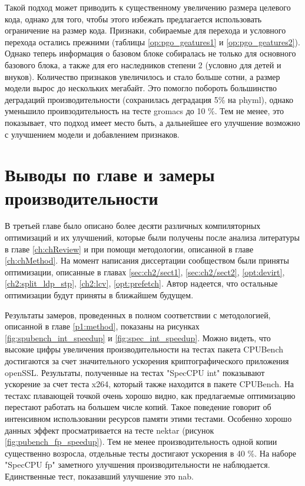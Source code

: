 Такой подход может приводить к существенному увеличению размера целевого кода, однако для того, чтобы этого избежать предлагается использовать ограничение на размер кода. Признаки, собираемые для перехода и условного перехода остались прежними (таблицы \ref{op:pgo_geatures1} и \ref{op:pgo_geatures2}). Однако теперь информация о базовом блоке собиралась не только для основного базового блока, а также для его наследников степени 2 (условно для детей и внуков). Количество признаков увеличилось и стало больше сотни, а размер модели вырос до нескольких мегабайт. Это помогло побороть большинство деградаций производительности (сохранилась деградация 5\% на phyml), однако уменьшило проивзодительность на тесте gromacs до 10 \%. Тем не менее, это показывает, что подход имеет место быть, а дальнейшее его улучшение возможно с улучшением модели и добавлением признаков.

\section{Выводы по главе и замеры производительности}  \label{results}
В третьей главе  было описано более десяти различных компиляторных оптимизаций и их улучшений, которые были получены после анализа литературы в главе \ref{ch:chReview} и при помощи методологии, описанной в главе \ref{ch:chMethod}. На момент написания диссертации сообществом были приняты оптимизации, описанные в главах \ref{sec:ch2/sect1}, \ref{sec:ch2/sect2}, \ref{opt:devirt}, \ref{ch2:split_ldp_stp}, \ref{ch2:lcv}, \ref{opt:prefetch}. Автор надеется, что остальные оптимизации будут приняты в ближайшем будущем.

Результаты замеров, проведенных в полном соответствии с методологией, описанной в главе \ref{p1:method}, показаны на рисунках \ref{fig:spubench_int_speedup} и \ref{fig:spec_int_speedup}. Можно видеть, что высокие цифры увеличения производительности на тестах пакета CPUBench достигаются за счет значительного ускорения криптографического приложения openSSL. Результаты, полученные на тестах "SpecCPU int"\phantom{ } показывают ускорение за счет теста x264, который также находится в пакете CPUBench. На тестахс плавающей точкой очень хорошо видно, как предлагаемые оптимизацию перестают работать на большем числе копий. Такое поведение говорит об интенсивном использовании ресурсов памяти этими тестами. Особенно хорошо данных эффект просматривается на тесте nektar (рисунок \ref{fig:pubench_fp_speedup}). Тем не менее производительность одной копии существенно возросла, отдельные тесты достигают ускорения в 40 \%. На наборе "SpecCPU fp" заметного улучшения производительности не наблюдается. Единственные тест, показавший улучшение это nab.

